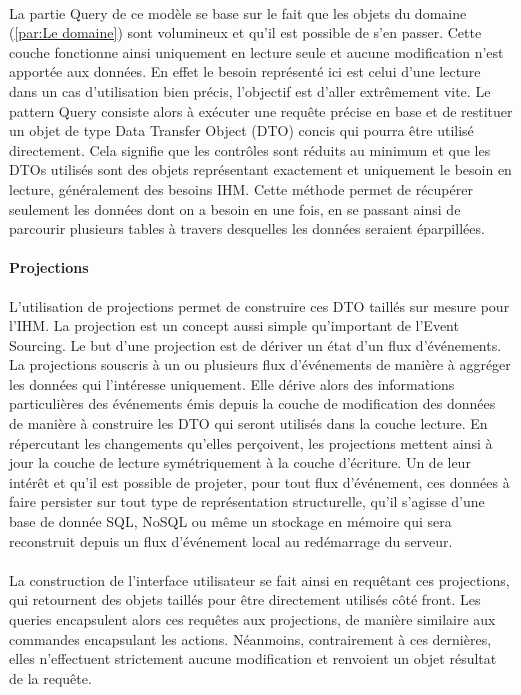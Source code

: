 \paragraph{}
La partie Query de ce modèle se base sur le fait que les objets du domaine (\ref{par:Le domaine}) sont volumineux et qu'il est possible de s'en passer.
Cette couche fonctionne ainsi uniquement en lecture seule et aucune modification n'est apportée aux données.
En effet le besoin représenté ici est celui d'une lecture dans un cas d'utilisation bien précis, l'objectif est d'aller extrêmement vite.
Le pattern Query consiste alors à exécuter une requête précise en base et de restituer un objet de type Data Transfer Object (DTO) concis qui pourra être utilisé directement.
Cela signifie que les contrôles sont réduits au minimum et que les DTOs utilisés sont des objets représentant exactement et uniquement le besoin en lecture, généralement des besoins IHM.
Cette méthode permet de récupérer seulement les données dont on a besoin en une fois, en se passant ainsi de parcourir plusieurs tables à travers desquelles les données seraient éparpillées.
\paragraph{Projections}
L'utilisation de projections permet de construire ces DTO taillés sur mesure pour l'IHM.
La projection est un concept aussi simple qu'important de l'Event Sourcing.
Le but d'une projection est de dériver un état d'un flux d'événements.
La projections souscris à un ou plusieurs flux d'événements de manière à aggréger les données qui l'intéresse uniquement.
Elle dérive alors des informations particulières des événements émis depuis la couche de modification des données de manière à construire les DTO qui seront utilisés dans la couche lecture.
En répercutant les changements qu'elles perçoivent, les projections mettent ainsi à jour la couche de lecture symétriquement à la couche d'écriture.
Un de leur intérêt et qu'il est possible de projeter, pour tout flux d'événement, ces données à faire persister sur tout type de représentation structurelle, qu'il s'agisse d'une base de donnée SQL, NoSQL ou même un stockage en mémoire qui sera reconstruit depuis un flux d'événement local au redémarrage du serveur.
\paragraph{}
La construction de l'interface utilisateur se fait ainsi en requêtant ces projections, qui retournent des objets taillés pour être directement utilisés côté front.
Les queries encapsulent alors ces requêtes aux projections, de manière similaire aux commandes encapsulant les actions.
Néanmoins, contrairement à ces dernières, elles n'effectuent strictement aucune modification et renvoient un objet résultat de la requête.
